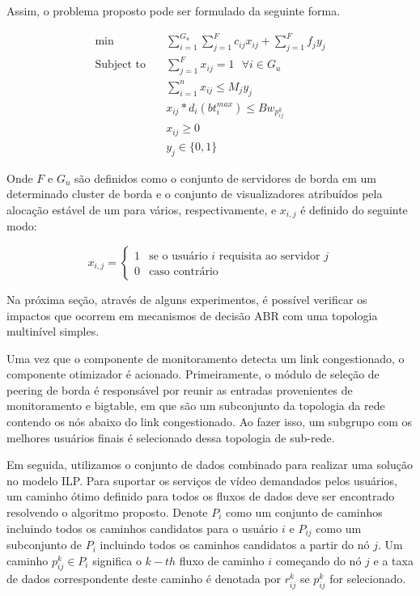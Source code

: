 Assim, o problema proposto pode ser formulado da seguinte forma.

\begin{equation} 
\begin{aligned}
\min{} \quad &
\sum^{G_u}_{i=1}\sum^{F}_{j=1} c_{ij}x_{ij} + \sum^{F}_{j=1} f_{j} y_{j} \\
%
\text{Subject to} \quad & 
\sum^{F}_{j=1} x_{ij} = 1 \text{ } \forall i \in G_u \\
&
\sum^{n}_{i=1} x_{ij} \leq M_{j}y_{j} \\
&
x_{ij} * d_{i}( bt_{i}^{max}) \leq Bw_{p_{ij}^{k}} \\
&
x_{ij} \geq 0 \\
&
y_{j} \in \{0,1\} 
\end{aligned}
\end{equation}

Onde $F$ e $G_u$ são definidos como o conjunto de servidores de borda em um determinado cluster de borda e o conjunto de visualizadores atribuídos pela alocação estável de um para vários, respectivamente, e $x_{i,j}$ é definido do seguinte modo:

\begin{equation}\label{total_capacity_loss}
x_{i,j} =
\begin{cases}
1 & \text{se o usuário } i \text{ requisita ao servidor } j \\ 
0 & \text{caso contrário }
\end{cases}
\end{equation}




Na próxima seção, através de alguns experimentos, é possível verificar os impactos que ocorrem em mecanismos de decisão ABR com uma topologia multinível simples.

Uma vez que o componente de monitoramento detecta um link congestionado, o componente otimizador é acionado. Primeiramente, o módulo de seleção de peering de borda é responsável por reunir as entradas provenientes de monitoramento e bigtable, em que são um subconjunto da topologia da rede contendo os nós abaixo do link congestionado. Ao fazer isso, um subgrupo com os melhores usuários finais é selecionado dessa topologia de sub-rede.

Em seguida, utilizamos o conjunto de dados combinado para realizar uma solução no modelo ILP.
Para suportar os serviços de vídeo demandados pelos usuários, um caminho ótimo definido para todos os fluxos de dados deve ser encontrado resolvendo o algoritmo proposto. Denote $P_{i}$ como um conjunto de caminhos incluindo todos os caminhos candidatos para o usuário $i$ e $P_{ij}$ como um subconjunto de $P_{i}$ incluindo todos os caminhos candidatos a partir do nó $j$. Um caminho $p_{ij}^{k} \in P_{i}$ significa o $k-th$ fluxo de caminho $i$ começando do nó $j$ e a taxa de dados correspondente deste caminho é denotada por $r_{ ij}^{k}$ se $p_{ij}^{k}$ for selecionado.

